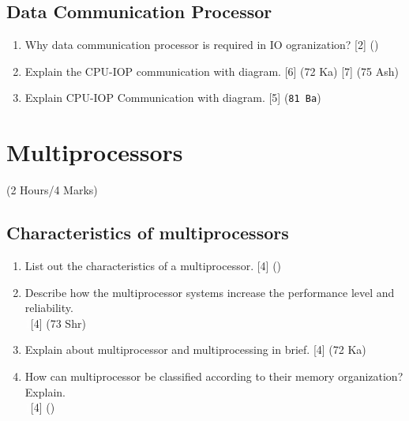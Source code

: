 \documentclass[12pt]{article}
\newcommand{\enter}{\\\textcolor{white}{1}}
\begin{document}
	\subsection{Data Communication Processor}
		\begin{enumerate}
			\item Why data communication processor is required in IO ogranization? \hfill [2] ()

			\item Explain the CPU-IOP communication with diagram. \hfill [6] (72 Ka) [7] (75 Ash)

			\item Explain CPU-IOP Communication with diagram. \hfill [5] (\texttt{81 Ba})
		\end{enumerate}


\pagebreak
\section{Multiprocessors}
	\begin{center}(2 Hours/4 Marks)\end{center}
	\subsection{Characteristics of multiprocessors}
		\begin{enumerate}
			\item List out the characteristics of a multiprocessor. \hfill [4] ()

			\item Describe how the multiprocessor systems increase the performance level and reliability.
			\enter\hfill [4] (73 Shr)

			\item Explain about multiprocessor and multiprocessing in brief. \hfill [4] (72 Ka)

			\item How can multiprocessor be classified according to their memory organization? Explain.
			\enter\hfill [4] ()
		\end{enumerate}
\end{document}
